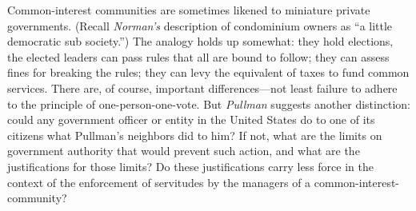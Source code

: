 
\item Common-interest communities are sometimes likened to miniature private
governments. (Recall \textit{Norman's} description of condominium owners as ``a
little democratic sub society.'') The analogy holds up somewhat: they hold
elections, the elected leaders can pass rules that all are bound to follow; they
can assess fines for breaking the rules; they can levy the equivalent of taxes
to fund common services. There are, of course, important differences---not least
failure to adhere to the principle of one-person-one-vote. But \textit{Pullman}
suggests another distinction: could any government officer or entity in the
United States do to one of its citizens what Pullman's neighbors did to him? If
not, what are the limits on government authority that would prevent such action,
and what are the justifications for those limits? Do these justifications carry
less force in the context of the enforcement of servitudes by the managers of a
common-interest-community?

